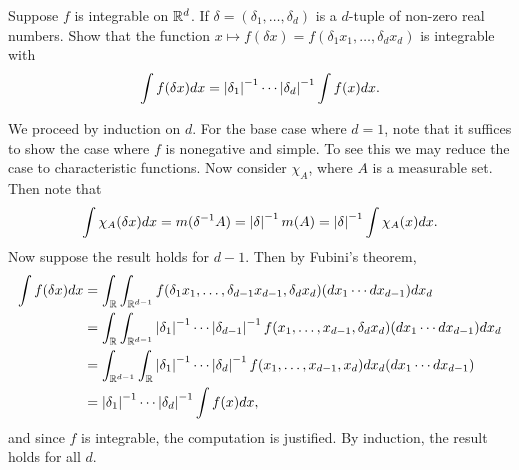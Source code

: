 \begin{exercise}
    Suppose $f$ is integrable on $\mathbb{R}^d$. If $\delta = (\delta_1,\ldots,\delta_d)$ 
    is a $d$-tuple of non-zero real numbers. Show that the function 
    $x\mapsto f(\delta x) = f(\delta_1x_1,\ldots,\delta_dx_d)$ is integrable 
    with 
    \begin{equation*}
        \int f(\delta x)dx = \left\lvert {\delta_1} \right\rvert^{-1}\cdots\left\lvert {\delta_d} \right\rvert^{-1}\int f(x)dx.
    \end{equation*}  
\end{exercise}
\begin{pf}
    We proceed by induction on $d$. For the base case where $d = 1$, 
    note that it suffices to show the case where $f$ is nonegative and 
    simple. To see this we may reduce the case to characteristic functions. 
    Now consider $\chi_A$, where $A$ is a measurable set. Then note that 
    \begin{equation*}
        \int \chi_A(\delta x)dx = m(\delta^{-1}A) = \left\lvert {\delta} \right\rvert^{-1}m(A) 
        = \left\lvert {\delta} \right\rvert^{-1}\int \chi_A(x)dx.
    \end{equation*}
    Now suppose the result holds for $d-1$. Then by Fubini's theorem, 
    \begin{equation*}
        \begin{split}
            \int f(\delta x)dx 
            &= \int_{\mathbb{R}} \int_{\mathbb{R}^{d-1}} f(\delta_1x_1, \ldots, \delta_{d-1}x_{d-1}, \delta_dx_d)(dx_1\cdots dx_{d-1})dx_d \\
            &= \int_{\mathbb{R}} \int_{\mathbb{R}^{d-1}} \left\lvert {\delta_1} \right\rvert^{-1}\cdots\left\lvert {\delta_{d-1}} \right\rvert^{-1}f(x_1,\ldots,x_{d-1},\delta_d x_d)(dx_1\cdots dx_{d-1})dx_d \\
            &= \int_{\mathbb{R}^{d-1}} \int_{\mathbb{R}} \left\lvert {\delta_1} \right\rvert^{-1}\cdots\left\lvert {\delta_d} \right\rvert^{-1}f(x_1,\ldots,x_{d-1}, x_d)dx_d(dx_1\cdots dx_{d-1}) \\
            &= \left\lvert {\delta_1} \right\rvert^{-1}\cdots\left\lvert {\delta_d} \right\rvert^{-1}\int f(x)dx,
        \end{split}
    \end{equation*}
    and since $f$ is integrable, the computation is justified. By induction, 
    the result holds for all $d$.
\end{pf}

